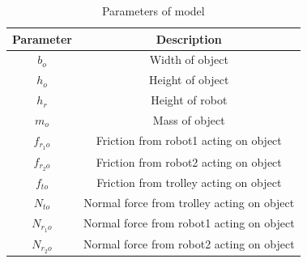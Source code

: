 \begin{table}[b]
\caption{Parameters of model}
\centering
\begin{tabular}{c|c}
\hline
Parameter & Description                   \\ \hline\hline
$b_o$       & Width of object              \\ \hline
$h_o$      & Height of object               \\ \hline
$h_r$      & Height of robot               \\ \hline
$m_o$     & Mass of object        \\ \hline
$f_{r_1 o}$       & Friction from robot1 acting on object                 \\ \hline
$f_{r_2 o}$ & Friction from robot2 acting on object                 \\ \hline
$f_{t o}$ & Friction from trolley acting on object                 \\ \hline
$N_{t o}$ & Normal force from trolley acting on object                 \\ \hline
$N_{r_1 o}$ & Normal force from robot1 acting on object                 \\ \hline
$N_{r_2 o}$ & Normal force from robot2 acting on object                 \\ \hline
\end{tabular}
\label{tab:model-parameter}
\end{table}

